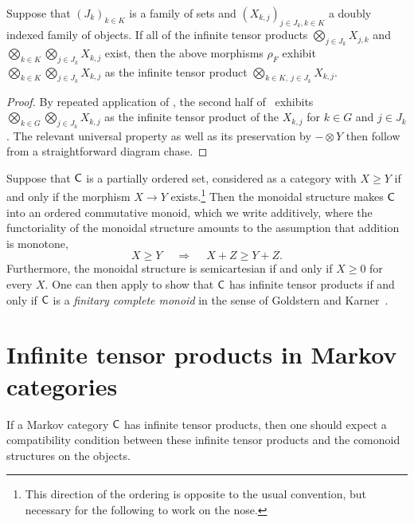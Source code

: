 \documentclass[11pt]{article}
\begin{document}
\begin{lemma}
	\label{infprod_operadic}
	Suppose that $(J_k)_{k \in K}$ is a family of sets and $(X_{k,j})_{j \in J_k, k \in K}$ a doubly indexed family of objects. If all of the infinite tensor products $\bigotimes_{j \in J_k} X_{j,k}$ and $\bigotimes_{k \in K} \bigotimes_{j \in J_k} X_{k,j}$ exist, then the above morphisms $\rho_F$ exhibit $\bigotimes_{k \in K} \bigotimes_{j \in J_k} X_{k,j}$ as the infinite tensor product $\bigotimes_{k \in K, \: j \in J_k} X_{k,j}$.
\end{lemma}
\begin{proof}
	By repeated application of , the second half of~ exhibits $\bigotimes_{k \in G} \bigotimes_{j \in J_k} X_{k,j}$ as the infinite tensor product of the $X_{k,j}$ for $k \in G$ and $j \in J_k$. The relevant universal property as well as its preservation by $- \otimes Y$ then follow from a straightforward diagram chase.
\end{proof}

\begin{example}[Perrone]
	\label{poset_case}
	Suppose that $\mathsf{C}$ is a partially ordered set, considered as a category with $X \geq Y$ if and only if the morphism $X \to Y$ exists.\footnote{This direction of the ordering is opposite to the usual convention, but necessary for the following to work on the nose.} Then the monoidal structure makes $\mathsf{C}$ into an ordered commutative monoid, which we write additively, where the functoriality of the monoidal structure amounts to the assumption that addition is monotone,
	\[
		X \geq Y \quad\: \Longrightarrow \quad\: X + Z \geq Y + Z.
	\]
	Furthermore, the monoidal structure is semicartesian if and only if $X \geq 0$ for every $X$. One can then apply  to show that $\mathsf{C}$ has infinite tensor products if and only if $\mathsf{C}$ is a \emph{finitary complete monoid} in the sense of Goldstern and Karner~\cite[Section~2.2]{karner}.
\end{example}

\section{Infinite tensor products in Markov categories}
\label{infprod_markov}

If a Markov category $\mathsf{C}$ has infinite tensor products, then one should expect a compatibility condition between these infinite tensor products and the comonoid structures on the objects. %
\end{document}

